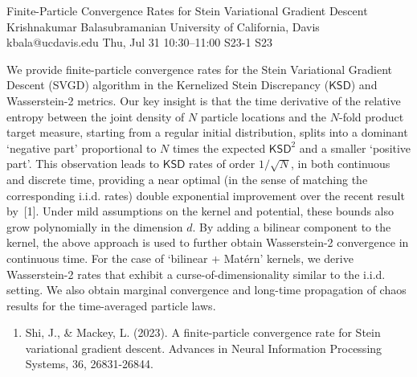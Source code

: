 \documentclass[12pt,lettersize,oneside]{book} %
\begin{document}
\begin{talk}
  {Finite-Particle Convergence Rates for Stein Variational Gradient Descent}%
  {Krishnakumar Balasubramanian}%
  {University of California, Davis}%
  {kbala@ucdavis.edu}%
  {}%
  {}%
  {Thu, Jul 31 10:30--11:00}%
  {S23-1}%
  {S23}%
  {}%
  
    
   
 We provide finite-particle convergence rates for the Stein Variational Gradient Descent (SVGD) algorithm in the Kernelized Stein Discrepancy ($\mathsf{KSD}$) and Wasserstein-2 metrics. Our key insight is that the time derivative of the relative entropy between the joint density of $N$ particle locations and the $N$-fold product target measure, starting from a regular initial distribution, splits into a dominant `negative part' proportional to $N$ times the expected $\mathsf{KSD}^2$ and a smaller `positive part'. This observation leads to $\mathsf{KSD}$ rates of order $1/\sqrt{N}$, in both continuous and discrete time, providing a near optimal (in the sense of matching the corresponding i.i.d. rates) double exponential improvement over the recent result by~[1]. Under mild assumptions on the kernel and potential, these bounds also grow polynomially in the dimension $d$. By adding a bilinear component to the kernel, the above approach is used to further obtain Wasserstein-2 convergence in continuous time. For the case of `bilinear + Mat\'ern' kernels, we derive Wasserstein-2 rates that exhibit a curse-of-dimensionality similar to the i.i.d. setting. We also obtain marginal convergence and long-time propagation of chaos results for the time-averaged particle laws. 

\medskip


\begin{enumerate}
 \item[{[1]}] Shi, J., \& Mackey, L. (2023). A finite-particle convergence rate for Stein variational gradient descent. Advances in Neural Information Processing Systems, 36, 26831-26844.
\end{enumerate}

\end{talk}
\end{document}
